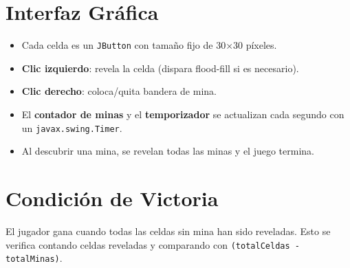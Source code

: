 \documentclass[12pt,a4paper]{article}
\begin{document}
\section{Interfaz Gráfica}

\begin{itemize}
  \item Cada celda es un \texttt{JButton} con tamaño fijo de 30×30 píxeles.
  \item \textbf{Clic izquierdo}: revela la celda (dispara flood-fill si es necesario).
  \item \textbf{Clic derecho}: coloca/quita bandera de mina.
  \item El \textbf{contador de minas} y el \textbf{temporizador} se actualizan cada segundo con un \texttt{javax.swing.Timer}.
  \item Al descubrir una mina, se revelan todas las minas y el juego termina.
\end{itemize}

\section{Condición de Victoria}

El jugador gana cuando todas las celdas sin mina han sido reveladas. Esto se verifica contando celdas reveladas y comparando con \texttt{(totalCeldas - totalMinas)}.
\end{document}
